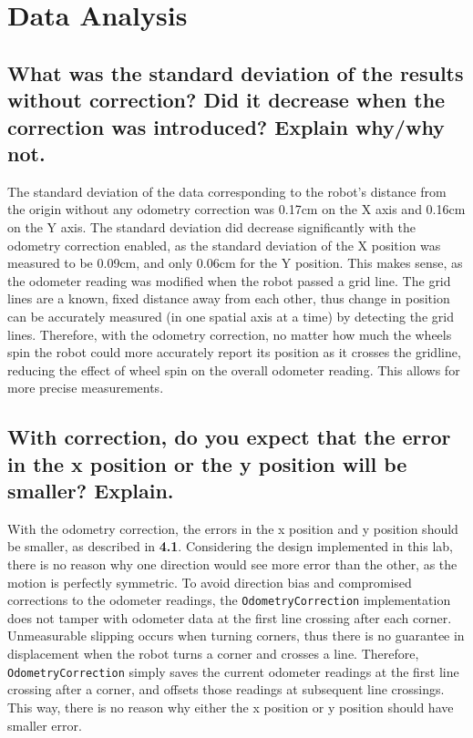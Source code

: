 \documentclass[11pt]{article} %
\begin{document}
\section{Data Analysis}
\subsection{What was the standard deviation of the results without correction? Did it decrease when
the correction was introduced? Explain why/why not.}
The standard deviation of the data corresponding to the robot's distance from the origin without any
odometry correction was 0.17cm on the X axis and 0.16cm on the Y axis. The standard deviation did
decrease significantly with the odometry correction enabled, as the standard deviation of the X
position was measured to be 0.09cm, and only 0.06cm for the Y position. This makes sense, as the
odometer reading was modified when the robot passed a grid line. The grid lines are a known, fixed
distance away from each other, thus change in position can be accurately measured (in one spatial
axis at a time) by detecting the grid lines. Therefore, with the odometry correction, no matter how
much the wheels spin the robot could more accurately report its position as it crosses the gridline,
reducing the effect of wheel spin on the overall odometer reading. This allows for more precise
measurements.
\subsection{With correction, do you expect that the error in the x position or the y position will
be smaller? Explain.}
With the odometry correction, the errors in the x position and y position should be smaller, as
described in \textbf{4.1}. Considering the design implemented in this lab, there is no reason why
one direction would see more error than the other, as the motion is perfectly symmetric. To avoid
direction bias and compromised corrections to the odometer readings, the \texttt{OdometryCorrection}
implementation does not tamper with odometer data at the first line crossing after each corner.
Unmeasurable slipping occurs when turning corners, thus there is no guarantee in displacement when
the robot turns a corner and crosses a line. Therefore, \texttt{OdometryCorrection} simply saves the
current odometer readings at the first line crossing after a corner, and offsets those readings at
subsequent line crossings. This way, there is no reason why either the x position or y position
should have smaller error.
\end{document}
